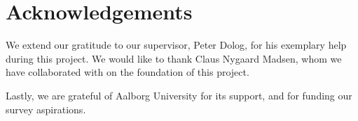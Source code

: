 \section{Acknowledgements}
We extend our gratitude to our supervisor, Peter Dolog, for his exemplary help during this project.
We would like to thank Claus Nygaard Madsen, whom we have collaborated with on the foundation of this project.

Lastly, we are grateful of Aalborg University for its support, and for funding our survey aspirations.